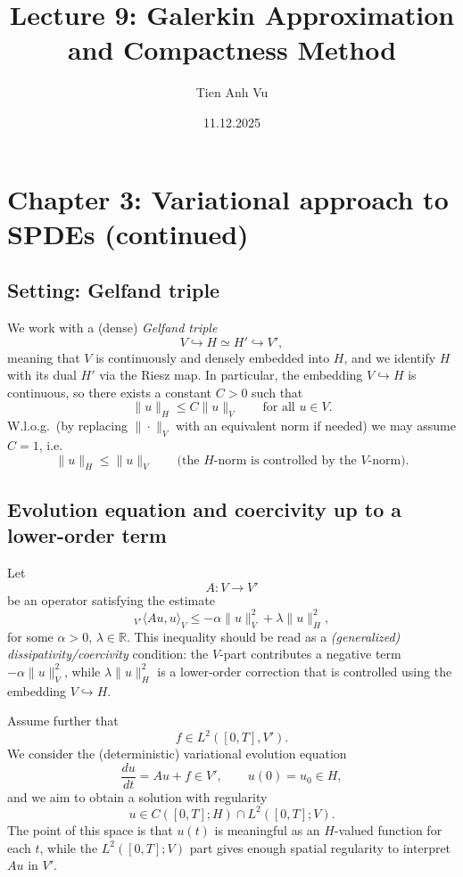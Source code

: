 \documentclass[11pt]{article}
\title{Lecture 9: Galerkin Approximation and Compactness Method}
\date{11.12.2025}
\author{Tien Anh Vu}
\theoremstyle{definition}
\theoremstyle{remark}
\newcommand{\dual}[2]{{}_{V'}\langle #1, #2 \rangle_{V}}
\begin{document}
\maketitle

\section*{Chapter 3: Variational approach to SPDEs (continued)}

\subsection*{Setting: Gelfand triple}
We work with a (dense) \emph{Gelfand triple}
\[
V \hookrightarrow H \simeq H' \hookrightarrow V',
\]
meaning that $V$ is continuously and densely embedded into $H$, and we identify $H$ with its dual $H'$ via the Riesz map.
In particular, the embedding $V\hookrightarrow H$ is continuous, so there exists a constant $C>0$ such that
\[
\|u\|_{H}\le C\|u\|_{V}\qquad \text{for all }u\in V.
\]
W.l.o.g.\ (by replacing $\|\cdot\|_{V}$ with an equivalent norm if needed) we may assume $C=1$, i.e.
\[
\|u\|_{H}\le \|u\|_{V}\qquad \text{(the $H$-norm is controlled by the $V$-norm).}
\]

\subsection*{Evolution equation and coercivity up to a lower-order term}
Let
\[
A:V\to V'
\]
be an operator satisfying the estimate
\[
\dual{Au}{u}\le -\alpha\|u\|_{V}^{2}+\lambda\|u\|_{H}^{2},
\]
for some $\alpha>0$, $\lambda\in\mathbb{R}$.
This inequality should be read as a \emph{(generalized) dissipativity/coercivity} condition: the $V$-part contributes a negative term $-\alpha\|u\|_{V}^{2}$, while $\lambda\|u\|_{H}^{2}$ is a lower-order correction that is controlled using the embedding $V\hookrightarrow H$.

Assume further that
\[
f\in L^{2}([0,T],V').
\]
We consider the (deterministic) variational evolution equation
\[
\frac{du}{dt}=Au+f\in V',
\qquad
u(0)=u_{0}\in H,
\]
and we aim to obtain a solution with regularity
\[
u\in C([0,T];H)\cap L^{2}([0,T];V).
\]
The point of this space is that $u(t)$ is meaningful as an $H$-valued function for each $t$, while the $L^{2}([0,T];V)$ part gives enough spatial regularity to interpret $Au$ in $V'$.
\end{document}
